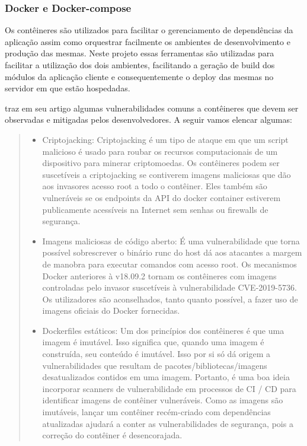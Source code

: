 \subsubsection{Docker e Docker-compose}

Os contêineres são utilizados para facilitar o gerenciamento de dependências da aplicação assim como orquestrar facilmente os ambientes de desenvolvimento e produção das mesmas. Neste projeto essas ferramentas são utilizadas para facilitar a utilização dos dois ambientes, facilitando a geração de build dos módulos da aplicação cliente e consequentemente o deploy das mesmas no servidor em que estão hospedadas.

\citeauthor{docker_vulnerabilities} traz em seu artigo algumas vulnerabilidades comuns a contêineres que devem ser observadas e mitigadas pelos desenvolvedores. A seguir vamos elencar algumas:

    \begin{quote}
        \begin{itemize}
            \item Criptojacking: Criptojacking é um tipo de ataque em que um script malicioso é usado para roubar os recursos computacionais de um dispositivo para minerar criptomoedas. Os contêineres podem ser suscetíveis a criptojacking se contiverem imagens maliciosas que dão aos invasores acesso root a todo o contêiner. Eles também são vulneráveis se os endpoints da API do docker container estiverem publicamente acessíveis na Internet sem senhas ou firewalls de segurança.
            \item Imagens maliciosas de código aberto: É uma vulnerabilidade que torna possível sobrescrever o binário runc do host dá aos atacantes a margem de manobra para executar comandos com acesso root. Os mecanismos Docker anteriores à v18.09.2 tornam os contêineres com imagens controladas pelo invasor suscetíveis à vulnerabilidade CVE-2019-5736. Os utilizadores são aconselhados, tanto quanto possível, a fazer uso de imagens oficiais do Docker fornecidas.
            \item Dockerfiles estáticos: Um dos princípios dos contêineres é que uma imagem é imutável. Isso significa que, quando uma imagem é construída, seu conteúdo é imutável. Isso por si só dá origem a vulnerabilidades que resultam de pacotes/bibliotecas/imagens desatualizados contidos em uma imagem. Portanto, é uma boa ideia incorporar scanners de vulnerabilidade em processos de CI / CD para identificar imagens de contêiner vulneráveis. Como as imagens são imutáveis, lançar um contêiner recém-criado com dependências atualizadas ajudará a conter as vulnerabilidades de segurança, pois a correção do contêiner é desencorajada.
        \end{itemize}
    \end{quote}

